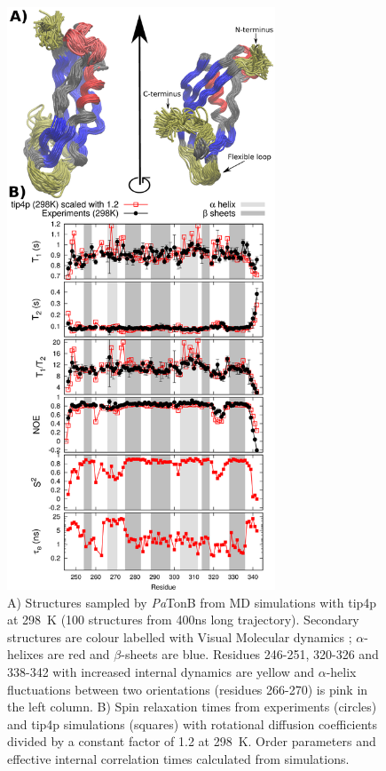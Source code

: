 \documentclass[pre,aps,floatfix,authordate1-4,twocolumn]{revtex4-1}
\begin{document}
\begin{figure}[!h]
  \includegraphics[width=8.0cm]{../Figs/RELdataPsTonB2.eps}%
  \caption{A) Structures sampled by {\it Pa}TonB from MD simulations with tip4p at 298~K
    (100 structures from 400ns long trajectory). Secondary structures
    are colour labelled with Visual Molecular dynamics \cite{frishman95,humphrey96};
    $\alpha$-helixes are red and $\beta$-sheets are blue.
    Residues 246-251, 320-326 and 338-342 with increased internal dynamics are yellow and
    $\alpha$-helix fluctuations between two orientations (residues 266-270) is pink in the left column.
    B) Spin relaxation times from experiments (circles) and tip4p
    simulations (squares) with rotational diffusion coefficients divided by a
    constant factor of 1.2 at 298~K. Order parameters and effective internal correlation
    times calculated from simulations. \label{PsTonBrelaxationDATAscaled}}%
\end{figure}
\end{document}
